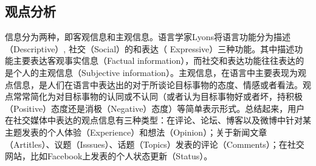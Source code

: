 \subsection{观点分析}


信息分为两种，即客观信息和主观信息。语言学家Lyons将语言功能分为描述（Descriptive）, 社交（Social）的和表达（ Expressive）三种功能。其中描述功能主要表达客观事实信息（Factual information），而社交和表达功能往往表达的是个人的主观信息（Subjective information）。主观信息，在语言中主要表现为观点信息，是人们在语言中表达出的对于所谈论目标事物的态度、情感或者看法。观点常常简化为对目标事物的认同或不认同（或者认为目标事物好或者坏，持积极（Positive）态度还是消极（Negative）态度）等简单表示形式。总结起来，用户在社交媒体中表达的观点信息有三种类型：在评论、论坛、博客以及微博中针对某主题发表的个人体验（Experience）和想法（Opinion）；关于新闻文章（Artitles）、议题（Isssues）、话题（Topics）发表的评论（Comments）；在社交网站，比如Facebook上发表的个人状态更新（Status）。

